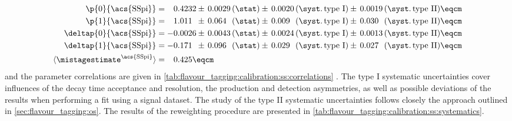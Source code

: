 \begin{equation*}\label{eq:flavour_tagging:calibration:ss:parameters}
  \begin{split}
    \p{0}{\text{\acs{SSpi}}}        &= \phantom{+}0.4232 \pm\, 
                                       0.0029 \text{\,(\stat)} \pm\, 
                                       0.0020 \text{\,(\syst.\,type I)} \pm\, 
                                       0.0019 \text{\,(\syst.\,type II)} \eqcm\\ %
    \p{1}{\text{\acs{SSpi}}}        &= \phantom{+}1.011\phantom{0} \pm\, 
                                       0.064\phantom{0} \text{\,(\stat)} \pm\, 
                                       0.009\phantom{0} \text{\,(\syst.\,type I)} \pm\, 
                                       0.030\phantom{0} \text{\,(\syst.\,type II)} \eqcm\\ %
    \deltap{0}{\text{\acs{SSpi}}} &= -0.0026 \pm\, 
                                      0.0043 \text{\,(\stat)} \pm\, 
                                      0.0024 \text{\,(\syst.\,type I)} \pm\, 
                                      0.0013 \text{\,(\syst.\,type II)} \eqcm \\
    \deltap{1}{\text{\acs{SSpi}}} &= -0.171\phantom{0} \pm\, 
                                      0.096\phantom{0} \text{\,(\stat)} \pm\, 
                                      0.029\phantom{0} \text{\,(\syst.\,type I)} \pm\, 
                                      0.027\phantom{0} \text{\,(\syst.\,type II)} \eqcm \\
    \langle\mistagestimate^{\text{\acs{SSpi}}}\rangle &= \phantom{+}0.425 \eqcm
  \end{split}
\end{equation*}
\endgroup
%
and the parameter correlations are given in
\cref{tab:flavour_tagging:calibration:ss:correlations} \cite{Aaij:2015vza}. The
type I systematic uncertainties cover influences of the decay time acceptance
and resolution, the production and detection asymmetries, as well as possible
deviations of the results when performing a fit using a signal \sweighted
dataset. The study of the type II systematic uncertainties follows closely the
approach outlined in \cref{sec:flavour_tagging:os}. The results of the
reweighting procedure are presented in
\cref{tab:flavour_tagging:calibration:ss:systematics}.
%
